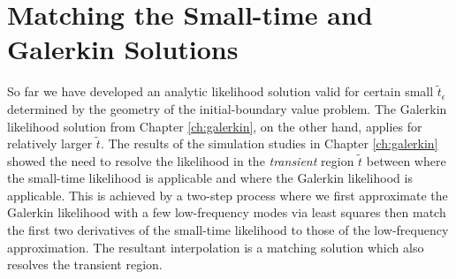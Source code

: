 \section{Matching the Small-time and Galerkin Solutions}
So far we have developed an analytic likelihood solution valid for
certain small $\tilde{t}_\epsilon$ determined by the geometry of the
initial-boundary value problem. The Galerkin likelihood solution from
Chapter \ref{ch:galerkin}, on the other hand, applies for relatively
larger $\tilde{t}$.  The results of the simulation studies in Chapter
\ref{ch:galerkin} showed the need to resolve the likelihood in the
\textit{transient} region $\tilde{t}$ between where the small-time
likelihood is applicable and where the Galerkin likelihood is
applicable. This is achieved by a two-step process where we first
approximate the Galerkin likelihood with a few low-frequency modes via
least squares then match the first two derivatives of the small-time
likelihood to those of the low-frequency approximation. The resultant
interpolation is a matching solution which also resolves the transient
region.

